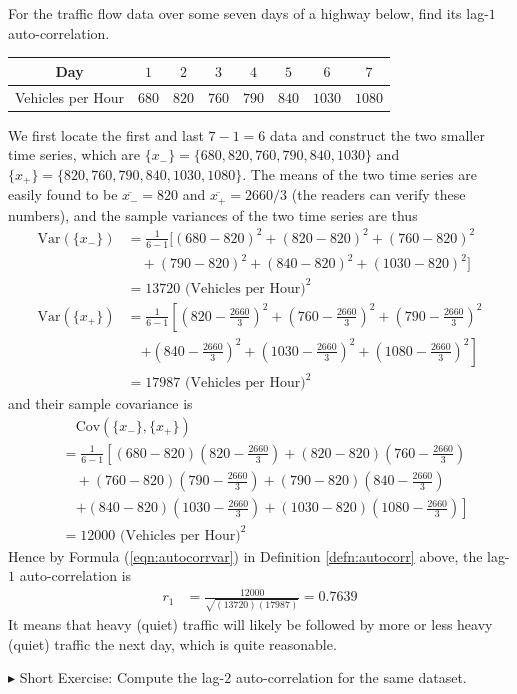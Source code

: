 \begin{exmp}
For the traffic flow data over some seven days of a highway below, find its lag-$1$ auto-correlation.
\begin{center}
\begin{tabular}{|c|c|c|c|c|c|c|c|}
\hline
Day & $1$ & $2$ & $3$ & $4$ & $5$ & $6$ & $7$ \\
\hline
Vehicles per Hour & $680$ & $820$ & $760$ & $790$ & $840$ & $1030$ & $1080$ \\
\hline
\end{tabular}
\end{center}
\end{exmp}
We first locate the first and last $7-1 = 6$ data and construct the two smaller time series, which are $\{x_-\} = \{680, 820, 760, 790, 840, 1030\}$ and $\{x_+\} = \{820, 760, 790, 840, 1030, 1080\}$. The means of the two time series are easily found to be $\overline{x_{-}} = 820$ and $\overline{x_{+}} = 2660/3$ (the readers can verify these numbers), and the sample variances of the two time series are thus
\begin{align*}
\text{Var}(\{x_-\}) &= \frac{1}{6-1}[(680 - 820)^2 + (820 - 820)^2 + (760 - 820)^2 \\
& \quad + (790 - 820)^2 + (840 - 820)^2 + (1030 - 820)^2] \\
&=13720 \text{ (Vehicles per Hour)}^2 \\
\text{Var}(\{x_+\}) &= \frac{1}{6-1}\left[\left(820 - \frac{2660}{3}\right)^2 + \left(760 - \frac{2660}{3}\right)^2 + \left(790 - \frac{2660}{3}\right)^2\right. \\
&\quad \left. + \left(840 - \frac{2660}{3}\right)^2 + \left(1030 - \frac{2660}{3}\right)^2 + \left(1080 - \frac{2660}{3}\right)^2\right] \\
&= 17987 \text{ (Vehicles per Hour)}^2
\end{align*}
and their sample covariance is
\begin{align*}
&\quad \text{Cov}(\{x_{-}\},\{x_{+}\}) \\
&= \frac{1}{6-1}\left[(680 - 820)\left(820 - \frac{2660}{3}\right) + (820 - 820)\left(760 - \frac{2660}{3}\right)\right. \\
&\quad + (760 - 820)\left(790 - \frac{2660}{3}\right)  + (790 - 820)\left(840 - \frac{2660}{3}\right) \\
&\quad \left. + (840 - 820)\left(1030 - \frac{2660}{3}\right) + (1030 - 820)\left(1080 - \frac{2660}{3}\right)\right] \\
&= 12000 \text{ (Vehicles per Hour)}^2
\end{align*}
Hence by Formula (\ref{eqn:autocorrvar}) in Definition \ref{defn:autocorr} above, the lag-$1$ auto-correlation is
\begin{align*}
r_1 &= \frac{12000}{\sqrt{(13720)(17987)}} = 0.7639
\end{align*}
It means that heavy (quiet) traffic will likely be followed by more or less heavy (quiet) traffic the next day, which is quite reasonable.\par
$\blacktriangleright$ Short Exercise: Compute the lag-$2$ auto-correlation for the same dataset.\footnotemark

